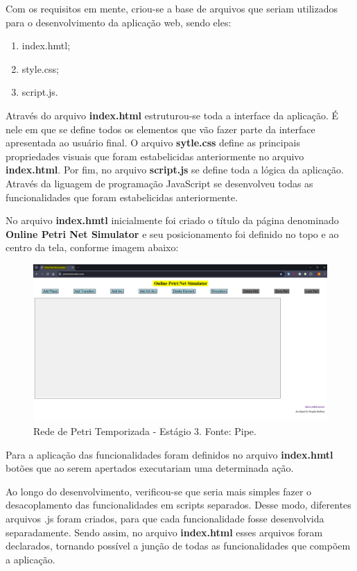 \documentclass[
	12pt,				%
	openright,			%
	oneside,			%
	a4paper,			%
	english,			%
	brazil				%
	]{abntex2}
\begin{document}
Com os requisitos em mente, criou-se a base de arquivos que seriam utilizados para o desenvolvimento da aplicação web, sendo eles: 

\begin{enumerate}
	\item index.hmtl;
	\item style.css;
	\item script.js.
\end{enumerate}

Através do arquivo \textbf{index.html} estruturou-se toda a interface da aplicação. É nele em que se define todos os elementos que vão fazer parte da interface apresentada ao usuário final. O arquivo \textbf{sytle.css} define as principais propriedades visuais que foram estabelicidas anteriormente no arquivo \textbf{index.html}. Por fim, no arquivo \textbf{script.js} se define toda a lógica da aplicação. Através da liguagem de programação JavaScript se desenvolveu todas as funcionalidades que foram estabelicidas anteriormente. 

No arquivo \textbf{index.hmtl} inicialmente foi criado o título da página denominado \textbf{Online Petri Net Simulator} e seu posicionamento foi definido no topo e ao centro da tela, conforme imagem abaixo:

\begin{figure}[ht] 
	\centering
	\includegraphics[scale=0.3]{figuras/tela_inicial_titulo_topo_centro.png}
	\caption[Título no topo e ao centro]{Rede de Petri Temporizada - Estágio 3. Fonte: Pipe.}
	\label{fig:titulo_topo_centro}
\end{figure}

Para a aplicação das funcionalidades foram definidos no arquivo  \textbf{index.hmtl} botões que ao serem apertados executariam uma determinada ação. 

Ao longo do desenvolvimento, verificou-se que seria mais simples fazer o desacoplamento das funcionalidades em scripts separados. Desse modo, diferentes arquivos .js foram criados, para que cada funcionalidade fosse desenvolvida separadamente. Sendo assim, no arquivo \textbf{index.html} esses arquivos foram declarados, tornando possível a junção de todas as funcionalidades que compõem a aplicação. 
\end{document}
